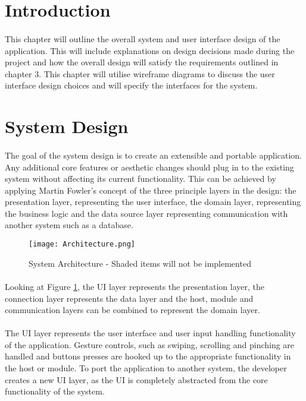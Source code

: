 \section{Introduction}
	\paragraph{}{
	This chapter will outline the overall system and user interface design of the application. This will include explanations on design decisions made during the project and how the overall design will satisfy the requirements outlined in chapter 3. This chapter will utilise wireframe diagrams to discuss the user interface design choices and will specify the interfaces for the system.
	}

\section{System Design}
	\paragraph{}{
	The goal of the system design is to create an extensible and portable application. Any additional core features or aesthetic changes should plug in to the existing system without affecting its current functionality. This can be achieved by applying Martin Fowler's concept of the three principle layers in the design: the presentation layer, representing the user interface, the domain layer, representing the business logic and the data source layer representing communication with another system such as a database.\cite{Fowler}
	}
	\begin{figure}[h]
		\begin{center}
			\texttt{[image: Architecture.png]}
			\caption{System Architecture - Shaded items will not be implemented}
			\label{fig:Architecture}
		\end{center}
	\end{figure}
	\paragraph{}{
	Looking at Figure \ref{fig:Architecture}, the UI layer represents the presentation layer, the connection layer represents the data layer and the host, module and communication layers can be combined to represent the domain layer.
	}	
	
	\paragraph{}{
	The UI layer represents the user interface and user input handling functionality of the application. Gesture controls, such as swiping, scrolling and pinching are handled and buttons presses are hooked up to the appropriate functionality in the host or module. To port the application to another system, the developer creates a new UI layer, as the UI is completely abstracted from the core functionality of the system.
	}	
	

